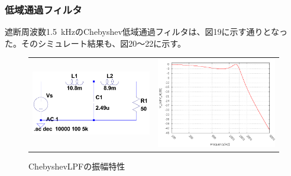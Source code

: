 \documentclass[10pt,a4j,dvipdfmx]{jsarticle}
\begin{document}
\subsubsection{低域通過フィルタ}
遮断周波数\SI{1.5}{\kilo\hertz}のChebyshev低域通過フィルタは、図19に示す通りとなった。そのシミュレート結果も、図20〜22に示す。

\begin{figure}[H]
    \begin{tabular}{cc}
      \begin{minipage}[t]{0.45\hsize}
        \centering
        \includegraphics[width=8cm]{CheLPF.png}
        \caption{ChebyshevLPF($f_c = 1500$)}
      \end{minipage} &
      \begin{minipage}[t]{0.45\hsize}
        \centering
        \includegraphics[width = 8cm]{CLPF_Vgraf.png}
        \caption{ChebyshevLPFの振幅特性}
      \end{minipage}
    \end{tabular}
  \end{figure}
\end{document}
